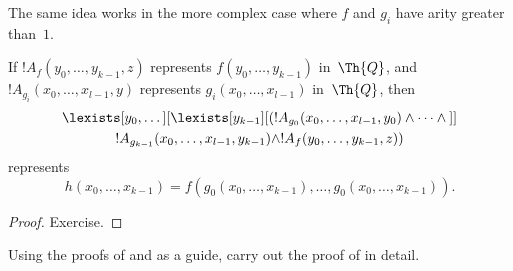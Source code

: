 \documentclass[../../../include/open-logic-section]{subfiles}
\begin{document}
The same idea works in the more complex case where $f$ and $g_i$ have
arity greater than~$1$.

\begin{prop}
If $!A_f(y_0, \dots, y_{k-1}, z)$ represents $f(y_0, \dots, y_{k-1})$
in~$\Th{Q}$, and $!A_{g_i}(x_0, \dots, x_{l-1}, y)$ represents
$g_i(x_0, \dots, x_{l-1})$ in~$\Th{Q}$, then
\begin{multline*}
  \lexists[y_0,\dots][\lexists[y_{k-1}][(!A_{g_0}(x_0,\dots,x_{l-1},y_0) \land
      \dots \land {}]]\\
  !A_{g_{k-1}}(x_0,\dots,x_{l-1},y_{k-1}) \land !A_f(y_0,\dots,y_{k-1},z))
\end{multline*}
represents
\[
h(x_0, \dots, x_{k-1}) = f(g_0(x_0, \dots, x_{k-1}), \dots, g_0(x_0,
\dots, x_{k-1})).
\]
\end{prop}

\begin{proof}
Exercise.
\end{proof}

\begin{prob}
Using the proofs of  and
 as a guide, carry out the proof of
 in detail.
\end{prob}
\end{document}
